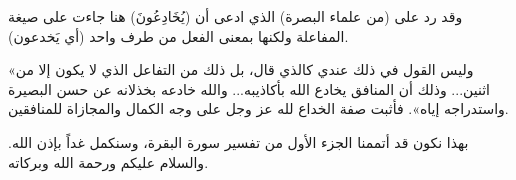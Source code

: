 وقد رد  على  (من علماء البصرة) الذي ادعى أن (يُخَادِعُونَ) هنا جاءت على صيغة المفاعلة ولكنها بمعنى الفعل من طرف واحد (أي يَخدعون). 

 «وليس القول في ذلك عندي كالذي قال، بل ذلك من التفاعل الذي لا يكون إلا من اثنين... وذلك أن المنافق يخادع الله بأكاذيبه... والله خادعه بخذلانه عن حسن البصيرة واستدراجه إياه». فأثبت  صفة الخداع لله عز وجل على وجه الكمال والمجازاة للمنافقين.

\separator

بهذا نكون قد أتممنا الجزء الأول من تفسير سورة البقرة، وسنكمل غداً بإذن الله. والسلام عليكم ورحمة الله وبركاته.
